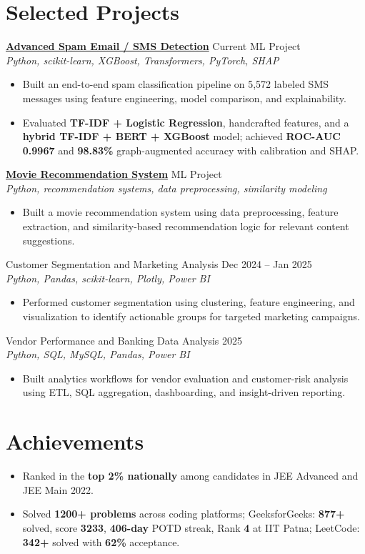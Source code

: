 \documentclass[9pt,letterpaper]{article}
\newcommand{\projectline}[3]{
  #1 \hfill {\small #2} \\
  {\small\textit{#3}} \\
}
\begin{document}
\section*{Selected Projects}
\projectline{\textbf{\href{https://github.com/nirvair09/advance_spam_email_detection_model}{Advanced Spam Email / SMS Detection}}}{Current ML Project}{Python, scikit-learn, XGBoost, Transformers, PyTorch, SHAP}
\begin{itemize}
    \item Built an end-to-end spam classification pipeline on 5,572 labeled SMS messages using feature engineering, model comparison, and explainability.
    \item Evaluated \textbf{TF-IDF + Logistic Regression}, handcrafted features, and a \textbf{hybrid TF-IDF + BERT + XGBoost} model; achieved \textbf{ROC-AUC 0.9967} and \textbf{98.83\%} graph-augmented accuracy with calibration and SHAP.
\end{itemize}

\projectline{\textbf{\href{https://github.com/nirvair09/movie-rec}{Movie Recommendation System}}}{ML Project}{Python, recommendation systems, data preprocessing, similarity modeling}
\begin{itemize}
    \item Built a movie recommendation system using data preprocessing, feature extraction, and similarity-based recommendation logic for relevant content suggestions.
\end{itemize}

\projectline{Customer Segmentation and Marketing Analysis}{Dec 2024 -- Jan 2025}{Python, Pandas, scikit-learn, Plotly, Power BI}
\begin{itemize}
    \item Performed customer segmentation using clustering, feature engineering, and visualization to identify actionable groups for targeted marketing campaigns.
\end{itemize}

\projectline{Vendor Performance and Banking Data Analysis}{2025}{Python, SQL, MySQL, Pandas, Power BI}
\begin{itemize}
    \item Built analytics workflows for vendor evaluation and customer-risk analysis using ETL, SQL aggregation, dashboarding, and insight-driven reporting.
\end{itemize}

\section*{Achievements}
\begin{itemize}
    \item Ranked in the \textbf{top 2\% nationally} among candidates in JEE Advanced and JEE Main 2022.
    \item Solved \textbf{1200+ problems} across coding platforms; GeeksforGeeks: \textbf{877+} solved, score \textbf{3233}, \textbf{406-day} POTD streak, Rank \textbf{4} at IIT Patna; LeetCode: \textbf{342+} solved with \textbf{62\%} acceptance.
\end{itemize}
\end{document}

